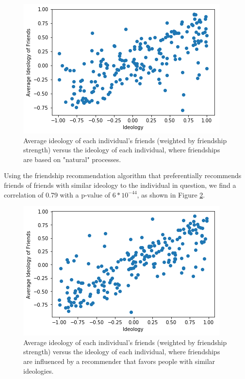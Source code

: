 \documentclass[12pt,letterpaper]{article}
\begin{document}
\begin{figure}[htbp!]
	\includegraphics[width=\linewidth]{no_intervention.png}
	\caption{Average ideology of each individual's friends (weighted by friendship strength) versus the ideology of each individual, where friendships are based on "natural" processes.}
	\label{fig:nointervention}
\end{figure}

Using the friendship recommendation algorithm that preferentially recommends friends of friends with similar ideology to the individual in question, we find a correlation of 0.79 with a p-value of $6*10^{-44}$, as shown in Figure \ref{fig:polar}.

\begin{figure}[htbp!]
	\includegraphics[width=\linewidth]{polar_intervention.png}
	\caption{Average ideology of each individual's friends (weighted by friendship strength) versus the ideology of each individual, where friendships are influenced by a recommender that favors people with similar ideologies.}
	\label{fig:polar}
\end{figure}
\end{document}
